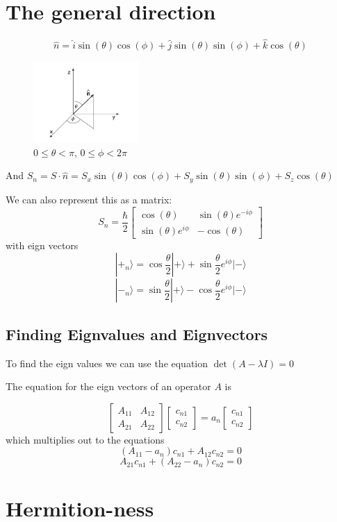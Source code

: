 \documentclass{homework}
\newcommand{\m}[1]{\begin{bmatrix} #1 \end{bmatrix}}
\newcommand{\ket}[1]{| #1 \rangle}
\begin{document}
\section{The general direction}
\[ \hat{n} = \hat{i}\sin(\theta)\cos(\phi)+ \hat{j}\sin(\theta)\sin(\phi) + \hat{k}\cos(\theta)\]

\begin{figure}[htp]
    \centering
    \includegraphics[width=4cm]{sphericalangles}
    \caption{$0 \leq \theta < \pi$, $0 \leq \phi < 2\pi$}

\end{figure}


And $S_n = S \cdot \hat{n} = S_x\sin(\theta)\cos(\phi)+ S_y\sin(\theta)\sin(\phi) + S_z\cos(\theta)$

We can also represent this as a matrix:
\[S_n  = \frac{\hbar}{2}\m{\cos(\theta) & \sin(\theta)e^{-i\phi} \\\sin(\theta)e^{i\phi} & -\cos(\theta)}\]
with eign vectors
\[\ket{+_n} = \cos \frac{\theta}{2}\ket{+} + \sin \frac{\theta}{2}e^{i\phi}\ket{-}\]
\[\ket{-_n} = \sin \frac{\theta}{2}\ket{+} - \cos \frac{\theta}{2}e^{i\phi}\ket{-}\]


\subsection{Finding Eignvalues and Eignvectors}

To find the eign values we can use the equation $\det(A - \lambda I) = 0$

The equation for the eign vectors of an operator $A$ is 

\[\m{A_{11} & A_{12} \\ A_{21} & A_{22}}\m{c_{n1} \\ c_{n2}} = a_n \m{c_{n1} \\ c_{n2}}\]
which multiplies out to the equations
\[(A_{11} - a_n)c_{n1} + A_{12}c_{n2} = 0\]
\[A_{21}c_{n1}+ (A_{22}- a_n)c_{n2} = 0\]


\section{Hermition-ness}
\end{document}
